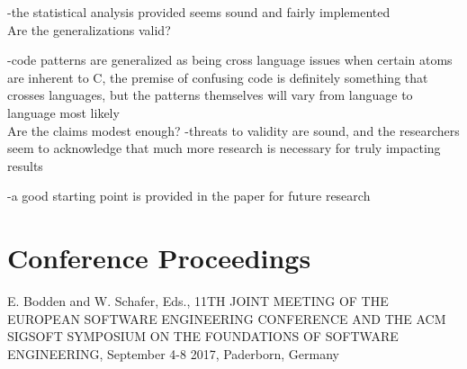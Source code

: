 \documentclass{IEEEtran}
\begin{document}
-the statistical analysis provided seems sound and fairly implemented
\\

Are the generalizations valid? 

-code patterns are generalized as being cross language issues when certain atoms are inherent to C, the premise of 
confusing code is definitely something that crosses languages, but the patterns themselves will vary from language to 
language most likely
\\

Are the claims modest enough?
-threats to validity are sound, and the researchers seem to acknowledge that much more research is necessary for truly
impacting results

-a good starting point is provided in the paper for future research

\clearpage
\section{Conference Proceedings}
E. Bodden and W. Schafer, Eds., 11TH JOINT MEETING OF THE EUROPEAN SOFTWARE ENGINEERING CONFERENCE AND THE ACM SIGSOFT SYMPOSIUM ON THE FOUNDATIONS OF SOFTWARE ENGINEERING, September 4-8 2017, Paderborn, Germany

\nocite{*}



\end{document}
